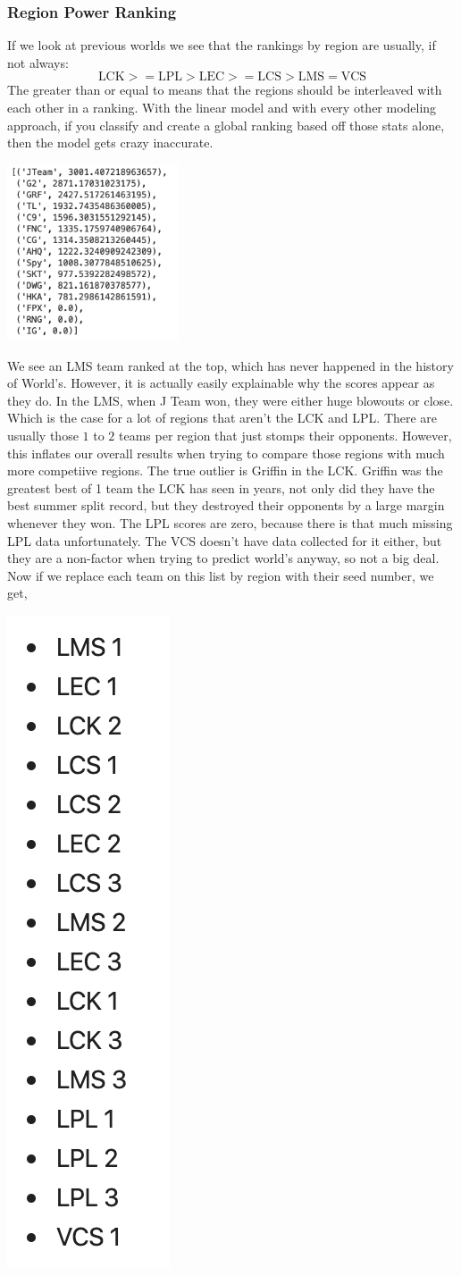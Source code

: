 \documentclass[11pt]{article}
\theoremstyle{plain}
\theoremstyle{definition}
\numberwithin{equation}{section}
\numberwithin{theorem}{section}
\numberwithin{lemma}{section}
\numberwithin{definition}{section}
\numberwithin{proposition}{section}
\numberwithin{corollary}{section}
\begin{document}
\subsubsection{Region Power Ranking}
	If we look at previous worlds we see that the rankings by region are usually, if not always:
	$$\text{LCK} >= \text{LPL} > \text{LEC} >= \text{LCS} > \text{LMS} = \text{VCS}$$
	The greater than or equal to means that the regions should be interleaved with each other in a ranking. With the linear model and with every other modeling approach, if you classify and create a global ranking based off those stats alone, then the model gets crazy inaccurate.
	\begin{center}
		\includegraphics[width=2in]{TeamRanking}
	\end{center}
	We see an LMS team ranked at the top, which has never happened in the history of World's. However, it is actually easily explainable why the scores appear as they do. In the LMS, when J Team won, they were either huge blowouts or close. Which is the case for a lot of regions that aren't the LCK and LPL. There are usually those $1$ to $2$ teams per region that just stomps their opponents. However, this inflates our overall results when trying to compare those regions with much more competiive regions. The true outlier is Griffin in the LCK. Griffin was the greatest best of 1 team the LCK has seen in years, not only did they have the best summer split record, but they destroyed their opponents by a large margin whenever they won. The LPL scores are zero, because there is that much missing LPL data unfortunately. The VCS doesn't have data collected for it either, but they are a non-factor when trying to predict world's anyway, so not a big deal. Now if we replace each team on this list by region with their seed number, we get,
	\begin{center}
		\includegraphics[width=.75in]{RegionRanking}
	\end{center}
	
\end{document}
